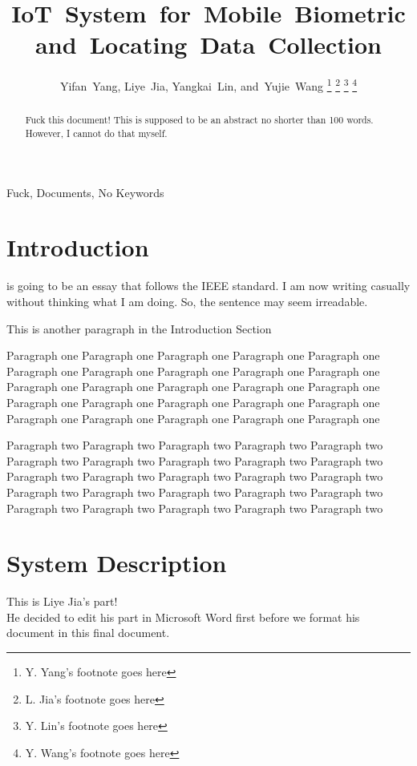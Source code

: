 \documentclass[10pt,journal,final,a4paper,nofonttune]{IEEEtran}
\title{IoT~System~for~Mobile~Biometric and~Locating~Data~Collection}
\author{Yifan~Yang,
        Liye~Jia,
        Yangkai~Lin,
        and~Yujie~Wang
\thanks{Y. Yang's footnote goes here}%
\thanks{L. Jia's footnote goes here}%
\thanks{Y. Lin's footnote goes here}%
\thanks{Y. Wang's footnote goes here}}
\begin{document}
\maketitle

\begin{abstract}
    Fuck this document! This is supposed to be an abstract no shorter 
    than 100 words. However, I cannot do that myself.
\end{abstract}

\begin{IEEEkeywords}
    Fuck, Documents, No Keywords
\end{IEEEkeywords}


\section{Introduction}
 is going to be an essay that follows the IEEE standard.
I am now writing casually without thinking what I am doing. So, the 
sentence may seem irreadable.
\cite{gomez2012overview}

This is another paragraph in the Introduction Section

Paragraph one Paragraph one Paragraph one Paragraph one Paragraph one 
Paragraph one Paragraph one Paragraph one Paragraph one Paragraph one 
Paragraph one Paragraph one Paragraph one Paragraph one Paragraph one 
Paragraph one Paragraph one Paragraph one Paragraph one Paragraph one 
Paragraph one Paragraph one Paragraph one Paragraph one Paragraph one 

Paragraph two Paragraph two Paragraph two Paragraph two Paragraph two 
Paragraph two Paragraph two Paragraph two Paragraph two Paragraph two 
Paragraph two Paragraph two Paragraph two Paragraph two Paragraph two 
Paragraph two Paragraph two Paragraph two Paragraph two Paragraph two 
Paragraph two Paragraph two Paragraph two Paragraph two Paragraph two 




\section{System Description}






This is Liye Jia's part! \\

He decided to edit his part in Microsoft Word first 
before we format his document in this final document. \\
\end{document}
